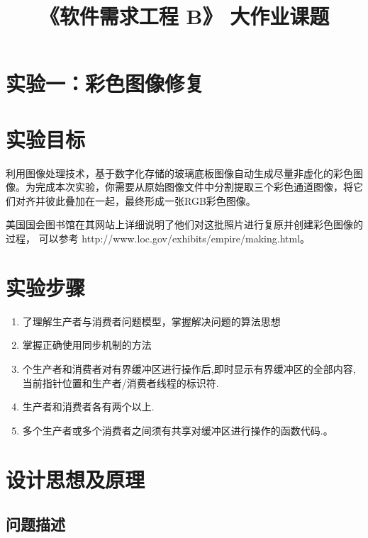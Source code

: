 \documentclass[withoutpreface,bwprint]{cumcmthesis} %
\title{《软件需求工程 B》 大作业课题}
\begin{document}
 
%  

\newpage

\section*{实验一：彩色图像修复}

\section{实验目标}
利用图像处理技术，基于数字化存储的玻璃底板图像自动生成尽量非虚化的彩色图像。为完成本次实验，你需要从原始图像文件中分割提取三个彩色通道图像，将它们对齐并彼此叠加在一起，最终形成一张RGB彩色图像。

美国国会图书馆在其网站上详细说明了他们对这批照片进行复原并创建彩色图像的过程，
可以参考 http://www.loc.gov/exhibits/empire/making.html。

\section{实验步骤}

\begin{enumerate}
\item 了理解生产者与消费者问题模型，掌握解决问题的算法思想 
\item 掌握正确使用同步机制的方法      
\item 个生产者和消费者对有界缓冲区进行操作后,即时显示有界缓冲区的全部内容,当前指针位置和生产者/消费者线程的标识符.          
\item 生产者和消费者各有两个以上.      
\item 多个生产者或多个消费者之间须有共享对缓冲区进行操作的函数代码.。
\end{enumerate}

\section{设计思想及原理}

\subsection{问题描述}
\end{document}
